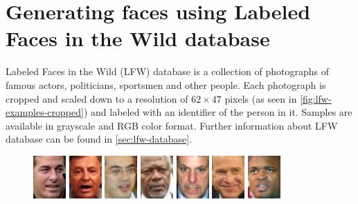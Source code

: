 \section{\label{sec:lfw-gan}Generating faces using Labeled Faces in the Wild database}
Labeled Faces in the Wild (LFW) database is a collection of photographs of famous actors, politicians, sportsmen and other people. Each photograph is cropped and scaled down to a resolution of $62\times 47$ pixels (as seen in \autoref{fig:lfw-examples-cropped}) and labeled with an identifier of the person in it. Samples are available in grayscale and RGB color format. Further information about LFW database can be found in \autoref{sec:lfw-database}.

\begin{figure}[!h]
    \centerline{
        \includegraphics[scale=1]{figures/lfw/lfw64x48color_real1.png}
        \includegraphics[scale=1]{figures/lfw/lfw64x48color_real2.png}
        \includegraphics[scale=1]{figures/lfw/lfw64x48color_real3.png}
        \includegraphics[scale=1]{figures/lfw/lfw64x48color_real4.png}
        \includegraphics[scale=1]{figures/lfw/lfw64x48color_real5.png}
        \includegraphics[scale=1]{figures/lfw/lfw64x48color_real6.png}
        \includegraphics[scale=1]{figures/lfw/lfw64x48color_real7.png}
}
\end{figure}
